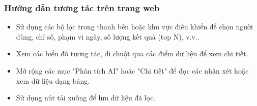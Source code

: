 \subsubsection{Hướng dẫn tương tác trên trang web}

\begin{itemize}
    \item Sử dụng các bộ lọc trong thanh bên hoặc khu vực điều khiển để chọn người dùng, chỉ số, phạm vi ngày, số lượng kết quả (top N), v.v..
    
    \item Xem các biểu đồ tương tác, di chuột qua các điểm dữ liệu để xem chi tiết.
    
    \item Mở rộng các mục "Phân tích AI" hoặc "Chi tiết" để đọc các nhận xét hoặc xem dữ liệu dạng bảng.
    
    \item Sử dụng nút tải xuống để lưu dữ liệu đã lọc.
\end{itemize}


